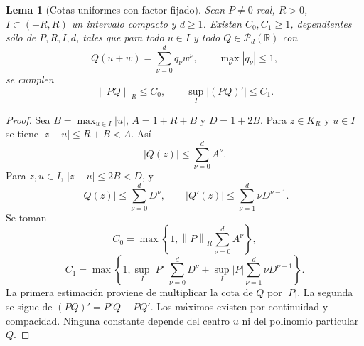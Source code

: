 \documentclass[11pt,a4paper]{article}
\numberwithin{equation}{section}
\newtheorem{lemma}[theorem]{Lema}
\theoremstyle{definition}
\theoremstyle{remark}
\newcommand{\R}{\mathbb R}
\newcommand{\PP}{\mathcal P}
\newcommand{\norm}[1]{\left\lVert#1\right\rVert}
\begin{document}
\begin{lemma}[Cotas uniformes con factor fijado]\label{lem:factorbounds}
Sean $P\ne0$ real, $R>0$, $I\subset(-R,R)$ un intervalo compacto y $d\ge1$. Existen $C_0,C_1\ge1$, dependientes sólo de $P,R,I,d$, tales que para todo $u\in I$ y todo $Q\in\PP_d(\R)$ con
\[
Q(u+w)=\sum_{\nu=0}^dq_\nu w^\nu,\qquad \max_\nu|q_\nu|\le1,
\]
se cumplen
\begin{equation}\label{eq:factorbounds}
\norm{PQ}_R\le C_0,\qquad \sup_I|(PQ)'|\le C_1.
\end{equation}
\end{lemma}
\begin{proof}
Sea $B=\max_{u\in I}|u|$, $A=1+R+B$ y $D=1+2B$. Para $z\in K_R$ y $u\in I$ se tiene $|z-u|\le R+B<A$. Así
\[
|Q(z)|\le\sum_{\nu=0}^d A^\nu.
\]
Para $z,u\in I$, $|z-u|\le2B<D$, y
\[
|Q(z)|\le\sum_{\nu=0}^dD^\nu,\qquad
|Q'(z)|\le\sum_{\nu=1}^d\nu D^{\nu-1}.
\]
Se toman
\[
C_0=\max\left\{1,\norm P_R\sum_{\nu=0}^dA^\nu\right\},
\]
\[
C_1=\max\left\{1,\sup_I|P'|\sum_{\nu=0}^dD^\nu+
\sup_I|P|\sum_{\nu=1}^d\nu D^{\nu-1}\right\}.
\]
La primera estimación proviene de multiplicar la cota de $Q$ por $|P|$. La segunda se sigue de $(PQ)'=P'Q+PQ'$. Los máximos existen por continuidad y compacidad. Ninguna constante depende del centro $u$ ni del polinomio particular $Q$.
\end{proof}
\end{document}
